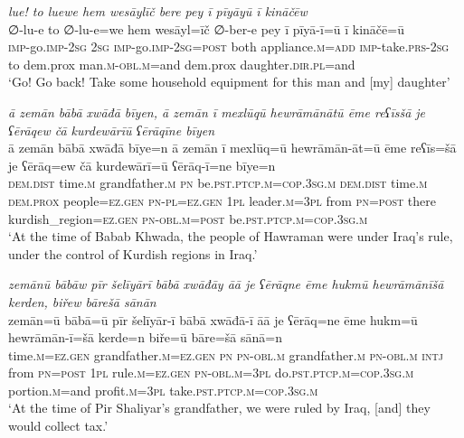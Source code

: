 \ea \label{ŽP.262}
\textit{lue! to luewe hem wesāylīč bere pey ī pīyāyū ī kināčēw} \\ 
\gll ∅-lu-e to ∅-lu-e=we hem wesāyl=īč ∅-ber-e pey ī pīyā-ī=ū ī kināčē=ū \\ 
 \textsc{imp-}go.\textsc{imp-}\textsc{2sg} \textsc{2sg} \textsc{imp-}go.\textsc{imp-}\textsc{2sg}\textsc{=\textsc{post}} both appliance\textsc{.m}\textsc{=add} \textsc{imp-}take\textsc{.prs}-\textsc{2sg} to dem.prox man\textsc{.m}\textsc{-obl}\textsc{.m}=and dem.prox daughter\textsc{.dir}\textsc{.pl}=and \\ 
\glt `Go! Go back! Take some household equipment for this man and [my] daughter'
\z 
 
\ea \label{BP.9}
\textit{ā zemān bābā xwāđā bīyen, ā zemān ī mexlūqū hewrāmānātū ēme reʕīsšā je ʕērāqew čā kurdewārīū ʕērāqīne bīyen} \\ 
\gll ā zemān bābā xwāđā bīye=n ā zemān ī mexlūq=ū hewrāmān-āt=ū ēme reʕīs=šā je ʕērāq=ew čā kurdewārī=ū ʕērāq-ī=ne bīye=n \\ 
 \textsc{dem.dist} time\textsc{.m} grandfather\textsc{.m} \textsc{pn} be\textsc{.pst}\textsc{.ptcp}\textsc{.m}\textsc{=cop}\textsc{.3sg}\textsc{.m} \textsc{dem.dist} time\textsc{.m} \textsc{dem.prox} people\textsc{=ez.gen} \textsc{pn}\textsc{\textsc{-pl}}\textsc{=ez.gen} \textsc{1pl} leader\textsc{.m}\textsc{=3pl} from \textsc{pn}\textsc{=\textsc{post}} there kurdish\_region\textsc{=ez.gen} \textsc{pn}\textsc{-obl}\textsc{.m}\textsc{=\textsc{post}} be\textsc{.pst}\textsc{.ptcp}\textsc{.m}\textsc{=cop}\textsc{.3sg}\textsc{.m} \\ 
\glt `At the time of Babab Khwada, the people of Hawraman were under Iraq’s rule, under the control of Kurdish regions in Iraq.'
\z 
 
\ea \label{BP.11}
\textit{zemānū bābāw pīr šelīyārī bābā xwāđāy āā je ʕērāqne ēme hukmū hewrāmānīšā kerden, biřew bārešā sānān} \\ 
\gll zemān=ū bābā=ū pīr šelīyār-ī bābā xwāđā-ī āā je ʕērāq=ne ēme hukm=ū hewrāmān-ī=šā kerde=n biře=ū bāre=šā sānā=n \\ 
 time\textsc{.m}\textsc{=ez.gen} grandfather\textsc{.m}\textsc{=ez.gen} \textsc{pn} \textsc{pn}\textsc{-obl}\textsc{.m} grandfather\textsc{.m} \textsc{pn}\textsc{-obl}\textsc{.m} \textsc{intj} from \textsc{pn}\textsc{=\textsc{post}} \textsc{1pl} rule\textsc{.m}\textsc{=ez.gen} \textsc{pn}\textsc{-obl}\textsc{.m}\textsc{=3pl} do\textsc{.pst}\textsc{.ptcp}\textsc{.m}\textsc{=cop}\textsc{.3sg}\textsc{.m} portion\textsc{.m}=and profit\textsc{.m}\textsc{=3pl} take\textsc{.pst}\textsc{.ptcp}\textsc{.m}\textsc{=cop}\textsc{.3sg}\textsc{.m} \\ 
\glt `At the time of Pir Shaliyar’s grandfather, we were ruled by Iraq, [and] they would collect tax.'
\z 
 
